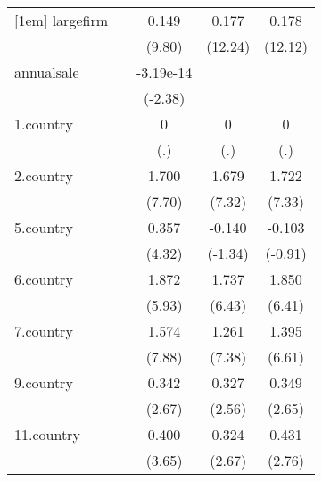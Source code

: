{\begin{tabular}{l*{4}{c}}
[1em]
largefirm   &                     &       0.149\sym{***}&       0.177\sym{***}&       0.178\sym{***}\\
            &                     &      (9.80)         &     (12.24)         &     (12.12)         \\
[1em]
annualsale  &                     &   -3.19e-14\sym{*}  &                     &                     \\
            &                     &     (-2.38)         &                     &                     \\
[1em]
1.country   &                     &           0         &           0         &           0         \\
            &                     &         (.)         &         (.)         &         (.)         \\
[1em]
2.country   &                     &       1.700\sym{***}&       1.679\sym{***}&       1.722\sym{***}\\
            &                     &      (7.70)         &      (7.32)         &      (7.33)         \\
[1em]
5.country   &                     &       0.357\sym{***}&      -0.140         &      -0.103         \\
            &                     &      (4.32)         &     (-1.34)         &     (-0.91)         \\
[1em]
6.country   &                     &       1.872\sym{***}&       1.737\sym{***}&       1.850\sym{***}\\
            &                     &      (5.93)         &      (6.43)         &      (6.41)         \\
[1em]
7.country   &                     &       1.574\sym{***}&       1.261\sym{***}&       1.395\sym{***}\\
            &                     &      (7.88)         &      (7.38)         &      (6.61)         \\
[1em]
9.country   &                     &       0.342\sym{**} &       0.327\sym{*}  &       0.349\sym{**} \\
            &                     &      (2.67)         &      (2.56)         &      (2.65)         \\
[1em]
11.country  &                     &       0.400\sym{***}&       0.324\sym{**} &       0.431\sym{**} \\
            &                     &      (3.65)         &      (2.67)         &      (2.76)         \\

\end{tabular}}
